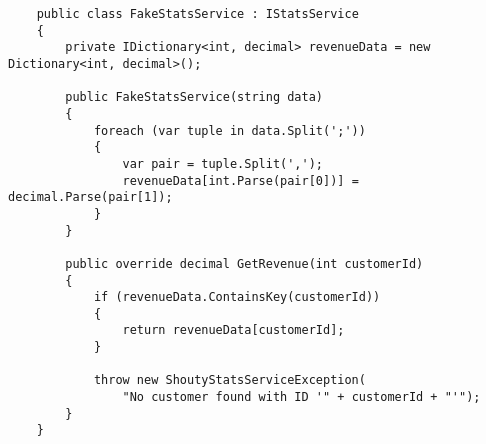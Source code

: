 \begin{verbatim}
    public class FakeStatsService : IStatsService
    {
        private IDictionary<int, decimal> revenueData = new Dictionary<int, decimal>();
    
        public FakeStatsService(string data)
        {
            foreach (var tuple in data.Split(';'))
            {
                var pair = tuple.Split(',');
                revenueData[int.Parse(pair[0])] = decimal.Parse(pair[1]);
            }
        }
    
        public override decimal GetRevenue(int customerId)
        {
            if (revenueData.ContainsKey(customerId))
            {
                return revenueData[customerId];
            }
    
            throw new ShoutyStatsServiceException(
                "No customer found with ID '" + customerId + "'");  
        }
    }
\end{verbatim}